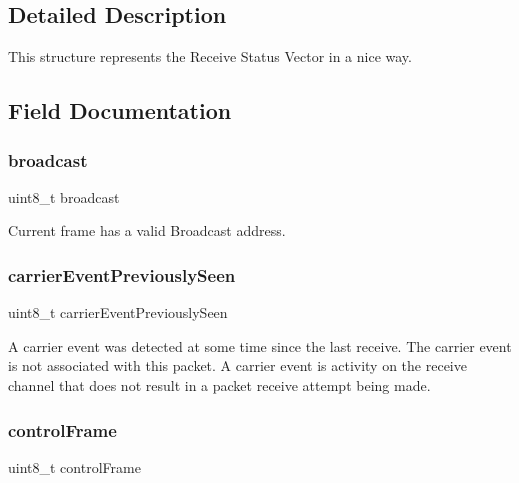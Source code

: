 \subsection{Detailed Description}
This structure represents the Receive Status Vector in a nice way. 

\subsection{Field Documentation}
\mbox{\label{struct_r_s_v___a6e3870c14f08dc47009ee5358a0f06bb}} 
\subsubsection{\texorpdfstring{broadcast}{broadcast}}
{\footnotesize\ttfamily uint8\+\_\+t broadcast}



Current frame has a valid Broadcast address. 

\mbox{\label{struct_r_s_v___a009a3b631b303f95d25e18876d2bcf6c}} 
\subsubsection{\texorpdfstring{carrierEventPreviouslySeen}{carrierEventPreviouslySeen}}
{\footnotesize\ttfamily uint8\+\_\+t carrier\+Event\+Previously\+Seen}

A carrier event was detected at some time since the last receive. The carrier event is not associated with this packet. A carrier event is activity on the receive channel that does not result in a packet receive attempt being made. \mbox{\label{struct_r_s_v___aa35d3ed42d81d27aa06f55388ac07d2d}} 
\subsubsection{\texorpdfstring{controlFrame}{controlFrame}}
{\footnotesize\ttfamily uint8\+\_\+t control\+Frame}



